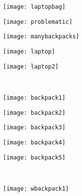 \documentclass{article}
\begin{document}
\begin{figure}[th]
    \centering
    \begin{subfigure}[b]{0.18\linewidth}
        \centering
        \texttt{[image: laptopbag]}
    \end{subfigure}    \hfill
        \begin{subfigure}[b]{0.18\linewidth}
        \centering
        \texttt{[image: problematic]}
    \end{subfigure}    \hfill
        \begin{subfigure}[b]{0.18\linewidth}
        \centering
        \texttt{[image: manybackpacks]}
    \end{subfigure}    \hfill
        \begin{subfigure}[b]{0.18\linewidth}
        \centering
        \texttt{[image: laptop]}
    \end{subfigure}   \hfill
    \begin{subfigure}[b]{0.18\linewidth}
        \centering
        \texttt{[image: laptop2]}
    \end{subfigure}  \\    
    \begin{subfigure}[b]{0.18\linewidth}
        \centering
        \texttt{[image: backpack1]}
    \end{subfigure}    \hfill
        \begin{subfigure}[b]{0.18\linewidth}
        \centering
        \texttt{[image: backpack2]}
    \end{subfigure}    \hfill
        \begin{subfigure}[b]{0.18\linewidth}
        \centering
        \texttt{[image: backpack3]}
    \end{subfigure}    \hfill
        \begin{subfigure}[b]{0.18\linewidth}
        \centering
        \texttt{[image: backpack4]}
    \end{subfigure}   \hfill
    \begin{subfigure}[b]{0.18\linewidth}
        \centering
        \texttt{[image: backpack5]}
    \end{subfigure}  \\
    \begin{subfigure}[b]{0.18\linewidth}
        \centering
        \texttt{[image: wbackpack1]}
    \end{subfigure}    \hfill

\end{figure}
\end{document}
